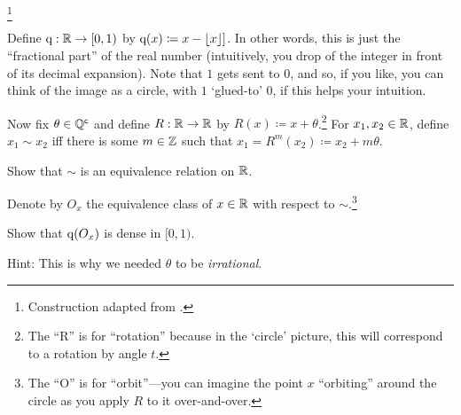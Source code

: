 \begin{exm}\begin{savenotes}\footnote{Construction adapted from \cite[pg.~407]{Pugh}.}\label{exm5.2.47}

Define $\mathrm{q} :\mathbb{R} \rightarrow [0,1)$ by $\mathrm{q} (x)\coloneqq x-\lfloor x\rfloor ]$.  In other words, this is just the ``fractional part'' of the real number (intuitively, you drop of the integer in front of its decimal expansion).  Note that $1$ gets sent to $0$, and so, if you like, you can think of the image as a circle, with $1$ `glued-to' $0$, if this helps your intuition.

Now fix $\theta \in \mathbb{Q} ^{\mathsf{c}}$ and define $R:\mathbb{R} \rightarrow \mathbb{R}$ by $R(x)\coloneqq x+\theta$.\footnote{The ``R'' is for ``rotation'' because in the `circle' picture, this will correspond to a rotation by angle $t$.}  For $x_1,x_2\in \mathbb{R}$, define $x_1\sim x_2$ iff there is some $m\in \mathbb{Z}$ such that $x_1=R^m(x_2)\coloneqq x_2+m\theta$.
\begin{exr}
Show that $\sim$ is an equivalence relation on $\mathbb{R}$.
\end{exr}
Denote by $O_x$ the equivalence class of $x\in \mathbb{R}$ with respect to $\sim$.\footnote{The ``O'' is for ``orbit''---you can imagine the point $x$ ``orbiting'' around the circle as you apply $R$ to it over-and-over.}
\begin{exr}
Show that $\mathrm{q} (O_x)$ is dense in $[0,1)$.
\begin{rmk}
Hint:  This is why we needed $\theta$ to be \emph{irrational}.
\end{rmk}
\end{exr}


\end{savenotes}
\end{exm}

